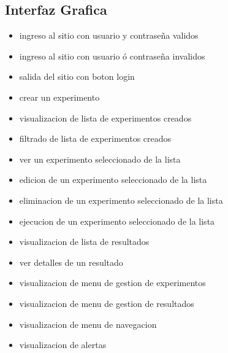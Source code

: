 \subsection{Interfaz Grafica}
\begin{itemize}
\item ingreso al sitio con usuario y contraseña validos
\item ingreso al sitio con usuario ó contraseña invalidos
\item salida del sitio con boton login

\item crear un experimento

\item visualizacion de lista de experimentos creados
\item filtrado de lista de experimentos creados

\item ver un experimento seleccionado de la lista
\item edicion de un experimento seleccionado de la lista
\item eliminacion de un experimento seleccionado de la lista
\item ejecucion de un experimento seleccionado de la lista

\item visualizacion de lista de resultados
\item ver detalles de un resultado
\item visualizacion de menu de gestion de experimentos
\item visualizacion de menu de gestion de resultados
\item visualizacion de menu de navegacion
\item visualizacion de alertas
\end{itemize}
\newpage